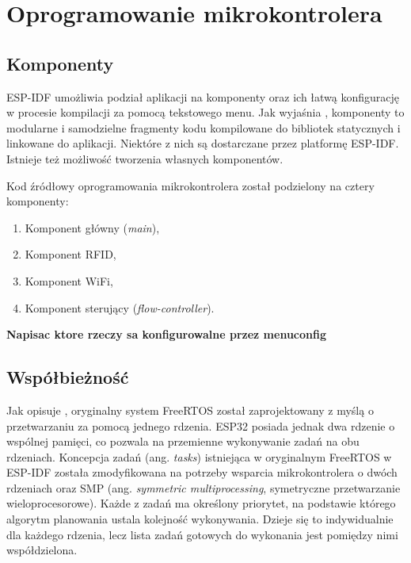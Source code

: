     \section{Oprogramowanie mikrokontrolera}

        \subsection{Komponenty}

            ESP-IDF umożliwia podział aplikacji na komponenty oraz ich łatwą konfigurację w procesie kompilacji za pomocą tekstowego menu. Jak wyjaśnia \cite{esp-idf-build-system}, komponenty to modularne i samodzielne fragmenty kodu kompilowane do bibliotek statycznych i linkowane do aplikacji. Niektóre z nich są dostarczane przez platformę ESP-IDF. Istnieje też możliwość tworzenia własnych komponentów.

            Kod źródłowy oprogramowania mikrokontrolera został podzielony na cztery komponenty:

            \begin{enumerate}
                \item Komponent główny (\textit{main}),
                \item Komponent RFID,
                \item Komponent WiFi,
                \item Komponent sterujący (\textit{flow-controller}).
            \end{enumerate}

            \textbf{Napisac ktore rzeczy sa konfigurowalne przez menuconfig}

        \subsection{Współbieżność}

            Jak opisuje \cite{esp-idf-freertos-smp-changes}, oryginalny system FreeRTOS został zaprojektowany z myślą o przetwarzaniu za pomocą jednego rdzenia. ESP32 posiada jednak dwa rdzenie o wspólnej pamięci, co pozwala na przemienne wykonywanie zadań na obu rdzeniach. Koncepcja zadań (ang. \textit{tasks}) istniejąca w oryginalnym FreeRTOS w ESP-IDF została zmodyfikowana na potrzeby wsparcia mikrokontrolera o dwóch rdzeniach oraz SMP (ang. \textit{symmetric multiprocessing}, symetryczne przetwarzanie wieloprocesorowe). Każde z zadań ma określony priorytet, na podstawie którego algorytm planowania ustala kolejność wykonywania. Dzieje się to indywidualnie dla każdego rdzenia, lecz lista zadań gotowych do wykonania jest pomiędzy nimi współdzielona.

